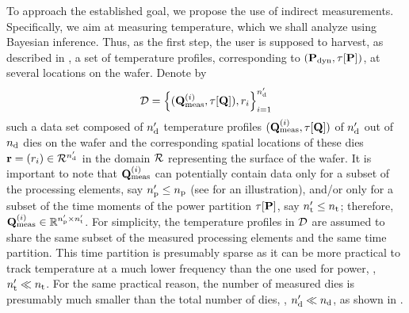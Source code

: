 To approach the established goal, we propose the use of indirect measurements. Specifically, we aim at measuring temperature, which we shall analyze using Bayesian inference. Thus, as the first step, the user is supposed to harvest, as described in , a set of temperature profiles, corresponding to $(\mathbf{P}_{\text{dyn}}, \tau[\mathbf{P}])$, at several locations on the wafer. Denote by
\[
  \mathcal{D} = \left\{ (\mathbf{Q}^{(i)}_{\text{meas}}, \tau[\mathbf{Q}]), r_i \right\}_{i = 1}^{n_\text{d}'}
\]
such a data set composed of ${n_\text{d}'}$ temperature profiles $(\mathbf{Q}^{(i)}_{\text{meas}}, \tau[\mathbf{Q}])$ of ${n_\text{d}'}$ out of ${n_\text{d}}$ dies on the wafer and the corresponding spatial locations of these dies $\mathbf{r} = (r_i) \in \mathcal{R}^{n_\text{d}'}$ in the domain $\mathcal{R}$ representing the surface of the wafer.
It is important to note that $\mathbf{Q}^{(i)}_{\text{meas}}$ can potentially contain data only for a subset of the processing elements, say ${n_\text{p}'} \leq {n_\text{p}}$ (see  for an illustration), and/or only for a subset of the time moments of the power partition $\tau[\mathbf{P}]$, say ${n_\text{t}'} \leq {n_\text{t}}$; therefore, $\mathbf{Q}^{(i)}_{\text{meas}} \in \mathbb{R}^{{n_\text{p}'} \times {n_\text{t}'}}$.
For simplicity, the temperature profiles in $\mathcal{D}$ are assumed to share the same subset of the measured processing elements and the same time partition.
This time partition is presumably sparse as it can be more practical to track temperature at a much lower frequency than the one used for power, \ie, ${n_\text{t}'} \ll {n_\text{t}}$.
For the same practical reason, the number of measured dies is presumably much smaller than the total number of dies, \ie, ${n_\text{d}'} \ll {n_\text{d}}$, as shown in .
